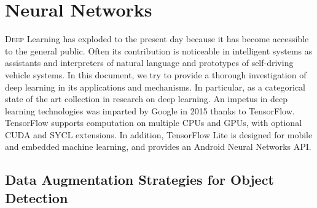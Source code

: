 \chapter{Neural Networks}
\label{chap:neuralnetworks}
%
\lettrine[lines=3]{D}{eep} Learning has exploded to the present day because it
has become accessible to the general public. Often its contribution is
noticeable in intelligent systems as assistants and interpreters of natural
language and prototypes of self-driving vehicle systems. In this document, we
try to provide a thorough investigation of deep learning in its applications and
mechanisms. In particular, as a categorical state of the art collection in
research on deep learning. An impetus in deep learning technologies was imparted
by Google in 2015 thanks to TensorFlow. TensorFlow supports computation on
multiple CPUs and GPUs, with optional CUDA and SYCL extensions. In addition,
TensorFlow Lite is designed for mobile and embedded machine learning, and
provides an Android Neural Networks API.\cite{article}
% 
% 





\section{Data Augmentation Strategies for Object Detection}
\label{sec:nn-augmentation-strategies}
